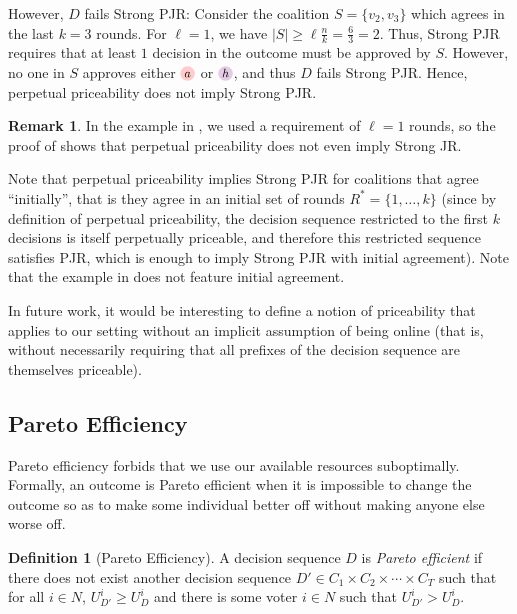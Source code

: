 \documentclass[10pt]{scrartcl}
\theoremstyle{plain}
\theoremstyle{definition}
\newtheorem{definition}[theorem]{Definition}
\newtheorem{remark}[theorem]{Remark}
\renewcommand*{\ge}{\geqslant}
\newcommand{\alternativea}{\tikz[baseline=-3pt,transform shape,scale=0.85]{\node[text height=6pt,inner sep=1pt,fill=red!20,    circle,minimum width=12pt] (x) {$a$};}}
\newcommand{\alternativeh}{\tikz[baseline=-3pt,transform shape,scale=0.85]{\node[text height=6pt,inner sep=1pt,fill=violet!20,    circle,minimum width=12pt] (x) {$h$};}}
\begin{document}
However, $D$ fails Strong PJR: Consider the coalition $S = \{v_2, v_3\}$ which agrees in the last $k = 3$ rounds. For $\ell = 1$, we have $|S| \ge \ell \frac{n}{k} = \frac63 = 2$. Thus, Strong PJR requires that at least $1$ decision in the outcome must be approved by $S$. However, no one in $S$ approves either $\alternativea$ or $\alternativeh$, and thus $D$ fails Strong PJR. Hence, perpetual priceability does not imply Strong PJR. \hfill \qedsymbol

\begin{remark}
	In the example in , we used a requirement of $\ell = 1$ rounds, so the proof of  shows that perpetual priceability does not even imply Strong JR.
\end{remark}

Note that perpetual priceability implies Strong PJR for coalitions that agree ``initially'', that is they agree in an initial set of rounds $R^* = \{1, \dots, k\}$ (since by definition of perpetual priceability, the decision sequence restricted to the first $k$ decisions is itself perpetually priceable, and therefore this restricted sequence satisfies PJR, which is enough to imply Strong PJR with initial agreement). Note that the example in  does not feature initial agreement.

In future work, it would be interesting to define a notion of priceability that applies to our setting without an implicit assumption of being online (that is, without necessarily requiring that all prefixes of the decision sequence are themselves priceable).

\subsection{Pareto Efficiency}
\label{app:pareto}

Pareto efficiency forbids that we use our available resources suboptimally. Formally, an outcome is Pareto efficient when it is impossible to change the outcome so as to make some individual better off without making anyone else worse off.

\begin{definition}[Pareto Efficiency]
    \label{def:pareto_efficiency}
    A decision sequence $D$ is \emph{Pareto efficient} if there does not exist another decision sequence $D' \in C_1 \times C_2 \times \cdots \times C_T$ such that for all $i \in N$, $U^i_{D'} \ge U^i_D$ and there is some voter $i \in N$ such that $U^i_{D'} > U^i_D$.
\end{definition}
\end{document}
